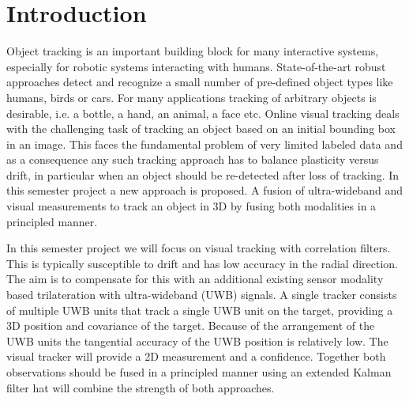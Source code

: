 
\setcounter{chapter}{0}

\chapter{Introduction}

Object tracking is an important building block for	many interactive systems, especially for robotic systems interacting with humans. State-of-the-art robust approaches detect and recognize a small number of pre-defined	object types like humans,	birds	or cars. For	many applications tracking of arbitrary objects	is desirable, i.e. a bottle,	a hand, an animal, a face etc. Online visual tracking deals with the	challenging	task of tracking an object based on an initial bounding box in an image. This faces the fundamental problem of very limited labeled data and as a consequence any such tracking approach has to balance plasticity	versus drift, in particular when an object	should	be re-detected after loss of tracking. In this semester project a new approach is proposed. A fusion of ultra-wideband and visual	measurements to track an object in 3D by fusing both modalities in a principled manner.

In this semester project we will focus on visual tracking with correlation filters. This is typically susceptible to drift and has low accuracy in the radial direction. The aim is to compensate for this with an additional existing sensor modality based trilateration with ultra-wideband (UWB) signals. A single tracker consists of multiple UWB units that track a single UWB unit on the target, providing a 3D position and covariance of the target. Because of the arrangement of the UWB units the tangential accuracy of the UWB position is relatively low. The visual tracker will provide a 2D measurement and a confidence. Together both observations should be fused in a principled manner using an extended Kalman filter hat will combine the strength of both approaches.